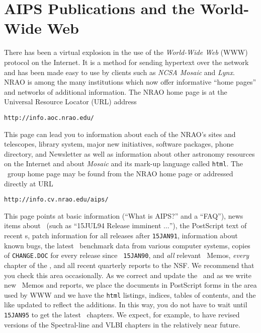 \vfill\eject
\section{AIPS Publications and the World-Wide Web}

     There has been a virtual explosion in the use of the {\it
World-Wide Web\/} (WWW) protocol on the Internet.  It is a method for
sending hypertext over the network and has been made easy to use by
clients such as {\it NCSA Mosaic\/} and {\it Lynx\/}.  NRAO is among
the many institutions which now offer informative ``home pages'' and
networks of additional information.  The NRAO home page is at the
Universal Resource Locator (URL) address
\begin{center}
\vskip -20pt
{\tt http://info.aoc.nrao.edu/}
\vskip -10pt
\end{center}
This page can lead you to information about each of the NRAO's sites
and telescopes, library system, major new initiatives, software
packages, phone directory, and Newsletter as well as information about
other astronomy resources on the Internet and about {\it Mosaic} and
its mark-up language called {\tt html}.  The \AIPS\ group home page
may be found from the NRAO home page or addressed directly at URL
\begin{center}
\vskip -10pt
{\tt http://info.cv.nrao.edu/aips/}
\vskip -10pt
\end{center}
This page points at basic information (``What is AIPS?'' and a
``FAQ''), news items about \AIPS\ (such as ``15JUL94 Release imminent
$\ldots$''), the PostScript text of recent \AIPSLETTER s, patch
information for all releases after {\tt 15JAN91}, information about
known bugs, the latest \AIPS\ benchmark data from various computer
systems, copies of {\tt CHANGE.DOC} for every release since {\tt
15JAN90}, and {\it all} relevant \AIPS\ Memos, {\it every} chapter of
the \Cookbook, and all recent quarterly reports to the \hbox{NSF}.  We
recommend that you check this area occasionally.  As we correct and
update the \Cookbook\ and as we write new \AIPS\ Memos and reports, we
place the documents in PostScript forms in the area used by WWW and we
have the {\tt html} listings, indices, tables of contents, and the
like updated to reflect the additions.  In this way, you do not have
to wait until {\tt 15JAN95} to get the latest \Cookbook\ chapters.  We
expect, for example, to have revised versions of the Spectral-line and
VLBI chapters in the relatively near future.

